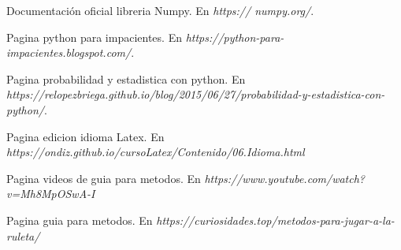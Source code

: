 \documentclass{article}
\begin{document}
\renewcommand\refname{Bibliografía} 
\begin{thebibliography}{1}

Documentación oficial libreria Numpy. 
\newblock
\newblock En {\em https:// numpy.org/}.

Pagina python para impacientes. 
\newblock
\newblock En {\em  https://python-para-impacientes.blogspot.com/}.

Pagina probabilidad y estadistica con python. 
\newblock
\newblock En {\em  https://relopezbriega.github.io/blog/2015/06/27/probabilidad-y-estadistica-con-python/}.

Pagina edicion idioma Latex. 
\newblock
\newblock En {\em 
https://ondiz.github.io/cursoLatex/Contenido/06.Idioma.html}

Pagina videos de guia para metodos. 
\newblock
\newblock En {\em 
https://www.youtube.com/watch?v=Mh8MpOSwA-I}

Pagina guia para metodos. 
\newblock
\newblock En {\em 
https://curiosidades.top/metodos-para-jugar-a-la-ruleta/}

\end{thebibliography}
\end{document}
